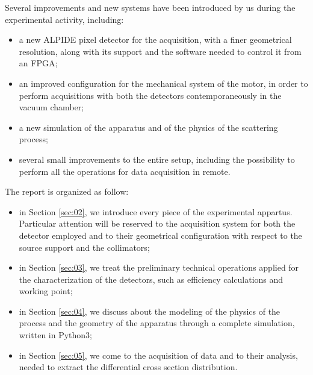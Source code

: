 \documentclass[../../main/main.tex]{subfiles}
\begin{document}
Several improvements and new systems have been introduced by us during the experimental activity, including:
\begin{itemize}
    \item a new ALPIDE pixel detector for the acquisition, with a finer geometrical resolution, along with its support and the software needed to control it from an FPGA;
    \item an improved configuration for the mechanical system of the motor, in order to perform acquisitions with both the detectors contemporaneously in the vacuum chamber;
    \item a new simulation of the apparatus and of the physics of the scattering process;
    \item several small improvements to the entire setup, including the possibility to perform all the operations for data acquisition in remote.
\end{itemize}

The report is organized as follow:
\begin{itemize}
    \item in Section \ref{sec:02}, we introduce every piece of the experimental appartus. Particular attention will be reserved to the acquisition system for both the detector employed and to their geometrical configuration with respect to the source support and the collimators;
    \item in Section \ref{sec:03}, we treat the preliminary technical operations applied for the characterization of the detectors, such as efficiency calculations and working point;
    \item in Section \ref{sec:04}, we discuss about the modeling of the physics of the process and the geometry of the apparatus through a complete simulation, written in Python3;
    \item in Section \ref{sec:05}, we come to the acquisition of data and to their analysis, needed to extract the differential cross section distribution.
\end{itemize}
\end{document}
